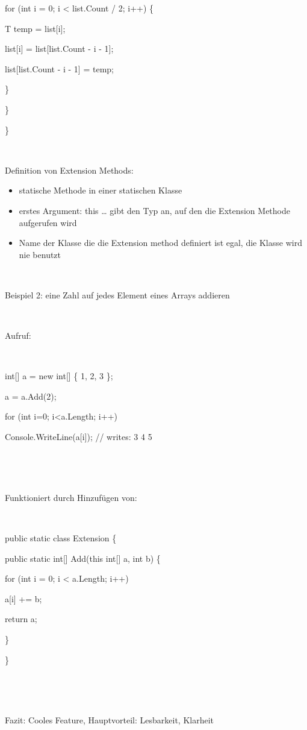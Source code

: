  for (int i = 0; i {\textless} list.Count / 2; i++) \{ 

 T temp = list[i]; 

 list[i] = list[list.Count {}- i {}- 1];  

 list[list.Count {}- i {}- 1] = temp; 

 \} 

\}

\}

~

Definition von Extension Methods: 

\begin{itemize}
\item statische Methode in einer statischen Klasse
\item erstes Argument: this … gibt den Typ an, auf den die Extension Methode aufgerufen wird
\item Name der Klasse die die Extension method definiert ist egal, die Klasse wird nie benutzt
\end{itemize}
~

Beispiel 2: eine Zahl auf jedes Element eines Arrays addieren

~

Aufruf: 

~

int[] a = new int[] \{ 1, 2, 3 \}; 

a = a.Add(2); 

for (int i=0; i{\textless}a.Length; i++) 

Console.WriteLine(a[i]); // writes: 3 4 5 

~

~

Funktioniert durch Hinzufügen von: 

~

public static class Extension \{ 

 public static int[] Add(this int[] a, int b) \{ 

 for (int i = 0; i {\textless} a.Length; i++) 

 a[i] += b; 

 return a; 

 \}

\} 

~

~

Fazit: Cooles Feature, Hauptvorteil: Lesbarkeit, Klarheit
\endinput
